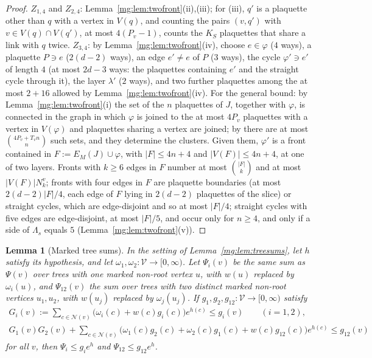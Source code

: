 \documentclass[11pt,a4paper]{article}
\newtheorem{lemma}[theorem]{Lemma}
\theoremstyle{definition}
\theoremstyle{remark}
\newcommand{\IIIref}[3]{\cite[#1~`#2' (\texttt{#3})]{III}}
\begin{document}
\begin{proof}
$Z_{1,4}$ and $Z_{2,4}$: Lemma~\ref{mg:lem:twofront}(ii),(iii); for (iii), $q'$ is a plaquette other than $q$ with a vertex in $V(q)$, and counting the
pairs $(v,q')$ with $v\in V(q)\cap V(q')$, at most $4(P_v-1)$, counts the $K_S$ plaquettes that share a link with $q$ twice. $Z_{3,4}$: by
Lemma~\ref{mg:lem:twofront}(iv), choose $e\in\varphi$ ($4$ ways), a plaquette $P\ni e$ ($2(d-2)$ ways), an edge $e'\ne e$ of $P$ ($3$ ways), the cycle
$\varphi'\ni e'$ of length $4$ (at most $2d-3$ ways: the plaquettes containing $e'$ and the straight cycle through it), the layer $\lambda'$ ($2$ ways), and
two further plaquettes among the at most $2+16$ allowed by Lemma~\ref{mg:lem:twofront}(iv). For the general bound: by
Lemma~\ref{mg:lem:twofront}(i) the set of the $n$ plaquettes of $J$, together with $\varphi$, is connected in the graph in which $\varphi$ is joined to the at
most $4P_v$ plaquettes with a vertex in $V(\varphi)$ and plaquettes sharing a vertex are joined; by \IIIref{Lemma}{Rooted counting}{al:lem:rooted} there are
at most $\binom{4P_v+T_vn}{n}$ such sets, and they determine the clusters. Given them, $\varphi'$ is a front contained in $F:=E_M(J)\cup\varphi$, with
$|F|\le4n+4$ and $|V(F)|\le4n+4$, at one of two layers. Fronts with $k\ge6$ edges in $F$ number at most $\binom{|F|}k$ and at most $|V(F)|N^v_k$; fronts
with four edges in $F$ are plaquette boundaries (at most $2(d-2)|F|/4$, each edge of $F$ lying in $2(d-2)$ plaquettes of the slice) or straight cycles,
which are edge-disjoint and so at most $|F|/4$; straight cycles with five edges are edge-disjoint, at most $|F|/5$, and occur only for $n\ge4$, and only if
a side of $\Lambda_s$ equals $5$
(Lemma~\ref{mg:lem:twofront}(v)).
\end{proof}

\begin{lemma}[Marked tree sums]\label{mg:lem:marked}
In the setting of Lemma~\ref{mg:lem:treesums}, let $h$ satisfy its hypothesis, and let $\omega_1,\omega_2:\mathcal V\to[0,\infty)$. Let $\Psi_i(v)$ be the
same sum as $\Psi(v)$ over trees with one marked non-root vertex $u$, with $w(u)$ replaced by $\omega_i(u)$, and $\Psi_{12}(v)$ the sum over trees with
two distinct marked non-root vertices $u_1,u_2$, with $w(u_j)$ replaced by $\omega_j(u_j)$. If $g_1,g_2,g_{12}:\mathcal V\to[0,\infty)$ satisfy
\begin{gather*}
G_i(v):=\sum_{c\in\mathcal N(v)}\bigl(\omega_i(c)+w(c)g_i(c)\bigr)e^{h(c)}\le g_i(v)\qquad(i=1,2),\\
G_1(v)G_2(v)+\sum_{c\in\mathcal N(v)}\bigl(\omega_1(c)g_2(c)+\omega_2(c)g_1(c)+w(c)g_{12}(c)\bigr)e^{h(c)}\le g_{12}(v)
\end{gather*}
for all $v$, then $\Psi_i\le g_ie^h$ and $\Psi_{12}\le g_{12}e^h$.
\end{lemma}
\end{document}
